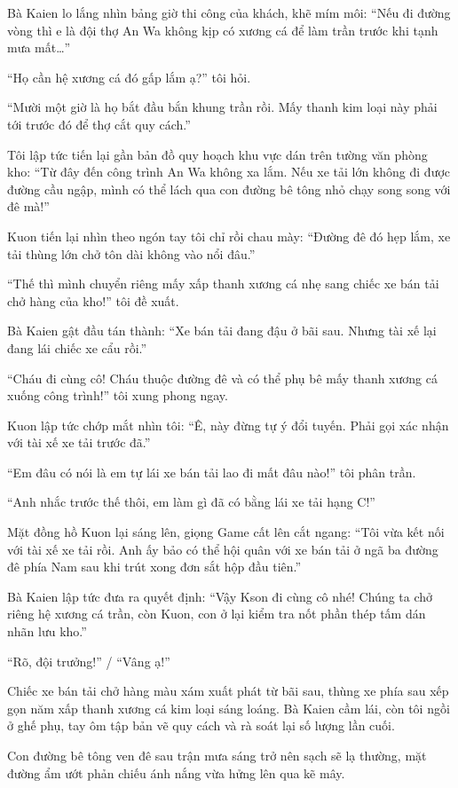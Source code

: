 ﻿\documentclass[../main.tex]{subfiles}
\begin{document}
Bà Kaien lo lắng nhìn bảng giờ thi công của khách, khẽ mím môi: ``Nếu đi đường vòng thì e là đội thợ An Wa không kịp có xương cá để làm trần trước khi tạnh mưa mất\dots''

``Họ cần hệ xương cá đó gấp lắm ạ?'' tôi hỏi.

``Mười một giờ là họ bắt đầu bắn khung trần rồi. Mấy thanh kim loại này phải tới trước đó để thợ cắt quy cách.''

Tôi lập tức tiến lại gần bản đồ quy hoạch khu vực dán trên tường văn phòng kho: ``Từ đây đến công trình An Wa không xa lắm. Nếu xe tải lớn không đi được đường cầu ngập, mình có thể lách qua con đường bê tông nhỏ chạy song song với đê mà!''

Kuon tiến lại nhìn theo ngón tay tôi chỉ rồi chau mày: ``Đường đê đó hẹp lắm, xe tải thùng lớn chở tôn dài không vào nổi đâu.''

``Thế thì mình chuyển riêng mấy xấp thanh xương cá nhẹ sang chiếc xe bán tải chở hàng của kho!'' tôi đề xuất.

Bà Kaien gật đầu tán thành: ``Xe bán tải đang đậu ở bãi sau. Nhưng tài xế lại đang lái chiếc xe cẩu rồi.''

``Cháu đi cùng cô! Cháu thuộc đường đê và có thể phụ bê mấy thanh xương cá xuống công trình!'' tôi xung phong ngay.

Kuon lập tức chớp mắt nhìn tôi: ``Ê, này đừng tự ý đổi tuyến. Phải gọi xác nhận với tài xế xe tải trước đã.''

``Em đâu có nói là em tự lái xe bán tải lao đi mất đâu nào!'' tôi phân trần.

``Anh nhắc trước thế thôi, em làm gì đã có bằng lái xe tải hạng C!''

Mặt đồng hồ Kuon lại sáng lên, giọng Game cất lên cắt ngang: ``Tôi vừa kết nối với tài xế xe tải rồi. Anh ấy bảo có thể hội quân với xe bán tải ở ngã ba đường đê phía Nam sau khi trút xong đơn sắt hộp đầu tiên.''

Bà Kaien lập tức đưa ra quyết định: ``Vậy Kson đi cùng cô nhé! Chúng ta chở riêng hệ xương cá trần, còn Kuon, con ở lại kiểm tra nốt phần thép tấm dán nhãn lưu kho.''

``Rõ, đội trưởng!'' / ``Vâng ạ!''

\ct

Chiếc xe bán tải chở hàng màu xám xuất phát từ bãi sau, thùng xe phía sau xếp gọn năm xấp thanh xương cá kim loại sáng loáng. Bà Kaien cầm lái, còn tôi ngồi ở ghế phụ, tay ôm tập bản vẽ quy cách và rà soát lại số lượng lần cuối.

Con đường bê tông ven đê sau trận mưa sáng trở nên sạch sẽ lạ thường, mặt đường ẩm ướt phản chiếu ánh nắng vừa hửng lên qua kẽ mây.
\end{document}

